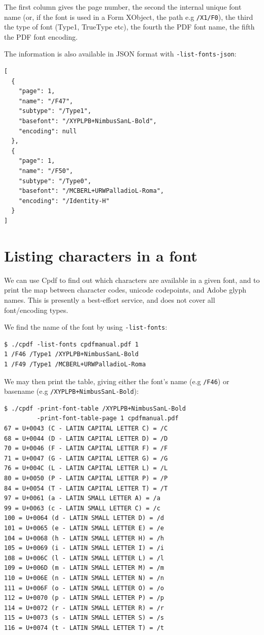 \documentclass{book}
\begin{document}
\noindent The first column gives the page number, the second the internal unique font
name (or, if the font is used in a Form XObject, the path e.g \texttt{/X1/F0}), the third the type of font (Type1, TrueType etc), the fourth the PDF font
name, the fifth the PDF font encoding.

The information is also available in JSON format with \texttt{-list-fonts-json}:

{\small\begin{framed}\small\begin{verbatim}[
  {
    "page": 1,
    "name": "/F47",
    "subtype": "/Type1",
    "basefont": "/XYPLPB+NimbusSanL-Bold",
    "encoding": null
  },
  {
    "page": 1,
    "name": "/F50",
    "subtype": "/Type0",
    "basefont": "/MCBERL+URWPalladioL-Roma",
    "encoding": "/Identity-H"
  }
]
\end{verbatim}
\end{framed}}


\section{Listing characters in a font}
We can use Cpdf to find out which characters are available in a given font, and to print the map between character codes, unicode codepoints, and Adobe glyph names. This is presently a best-effort service, and does not cover all font/encoding types.

We find the name of the font by using \texttt{-list-fonts}:

{\small\begin{verbatim}
$ ./cpdf -list-fonts cpdfmanual.pdf 1
1 /F46 /Type1 /XYPLPB+NimbusSanL-Bold 
1 /F49 /Type1 /MCBERL+URWPalladioL-Roma 
\end{verbatim}}

\noindent We may then print the table, giving either the font's name (e.g \texttt{/F46}) or basename (e.g \texttt{/XYPLPB+NimbusSanL-Bold}):

{\small\begin{verbatim}
$ ./cpdf -print-font-table /XYPLPB+NimbusSanL-Bold
         -print-font-table-page 1 cpdfmanual.pdf
67 = U+0043 (C - LATIN CAPITAL LETTER C) = /C
68 = U+0044 (D - LATIN CAPITAL LETTER D) = /D
70 = U+0046 (F - LATIN CAPITAL LETTER F) = /F
71 = U+0047 (G - LATIN CAPITAL LETTER G) = /G
76 = U+004C (L - LATIN CAPITAL LETTER L) = /L
80 = U+0050 (P - LATIN CAPITAL LETTER P) = /P
84 = U+0054 (T - LATIN CAPITAL LETTER T) = /T
97 = U+0061 (a - LATIN SMALL LETTER A) = /a
99 = U+0063 (c - LATIN SMALL LETTER C) = /c
100 = U+0064 (d - LATIN SMALL LETTER D) = /d
101 = U+0065 (e - LATIN SMALL LETTER E) = /e
104 = U+0068 (h - LATIN SMALL LETTER H) = /h
105 = U+0069 (i - LATIN SMALL LETTER I) = /i
108 = U+006C (l - LATIN SMALL LETTER L) = /l
109 = U+006D (m - LATIN SMALL LETTER M) = /m
110 = U+006E (n - LATIN SMALL LETTER N) = /n
111 = U+006F (o - LATIN SMALL LETTER O) = /o
112 = U+0070 (p - LATIN SMALL LETTER P) = /p
114 = U+0072 (r - LATIN SMALL LETTER R) = /r
115 = U+0073 (s - LATIN SMALL LETTER S) = /s
116 = U+0074 (t - LATIN SMALL LETTER T) = /t
\end{verbatim}}
\end{document}
